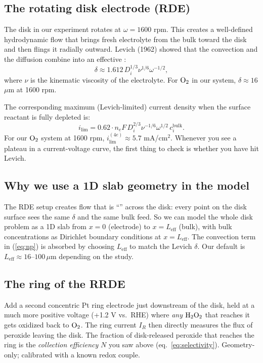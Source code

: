\documentclass[11pt]{article}
\begin{document}
\subsection{The rotating disk electrode (RDE)}

The disk in our experiment rotates at $\omega = 1600$ rpm. This
creates a well-defined hydrodynamic flow that brings fresh
electrolyte from the bulk toward the disk and then flings it
radially outward. Levich (1962) showed that the convection and the
diffusion combine into an effective :
\begin{equation}
  \delta \approx 1.612\, D_i^{1/3} \nu^{1/6} \omega^{-1/2},
  \label{eq:levich-thickness}
\end{equation}
where $\nu$ is the kinematic viscosity of the electrolyte. For
$\mathrm{O_2}$ in our system, $\delta \approx 16$ $\mu$m at 1600 rpm.

The corresponding maximum (Levich-limited) current density when the
surface reactant is fully depleted is:
\begin{equation}
  i_{\mathrm{lim}} = 0.62 \cdot n_e F \, D_i^{2/3}\nu^{-1/6}\omega^{1/2}\, c_i^{\mathrm{bulk}}.
  \label{eq:levich}
\end{equation}
For our $\mathrm{O_2}$ system at 1600 rpm,
$i_{\mathrm{lim}}^{(4e)} \approx 5.7$ mA/cm$^2$. Whenever you see a
plateau in a current-voltage curve, the first thing to check is
whether you have hit Levich.

\subsection{Why we use a 1D slab geometry in the model}

The RDE setup creates flow that is ``''
across the disk: every point on the disk surface sees the same
$\delta$ and the same bulk feed. So we can model the whole disk
problem as a 1D slab from $x=0$ (electrode) to $x=L_{\mathrm{eff}}$
(bulk), with bulk concentrations as Dirichlet boundary conditions at
$x = L_{\mathrm{eff}}$. The convection term in (\ref{eq:np}) is
absorbed by choosing $L_{\mathrm{eff}}$ to match the Levich
$\delta$. Our default is
$L_{\mathrm{eff}} \approx 16$--$100\,\mu$m depending on the study.

\subsection{The ring of the RRDE}

Add a second concentric Pt ring electrode just downstream of the
disk, held at a much more positive voltage (+1.2 V vs.\ RHE) where
\emph{any} $\mathrm{H_2O_2}$ that reaches it gets oxidized back to
$\mathrm{O_2}$. The ring current $I_R$ then directly measures the flux of
peroxide leaving the disk. The fraction of disk-released peroxide
that reaches the ring is the \emph{collection efficiency} $N$ you saw
above (eq.~\ref{eq:selectivity}). Geometry-only; calibrated with a
known redox couple.
\end{document}
